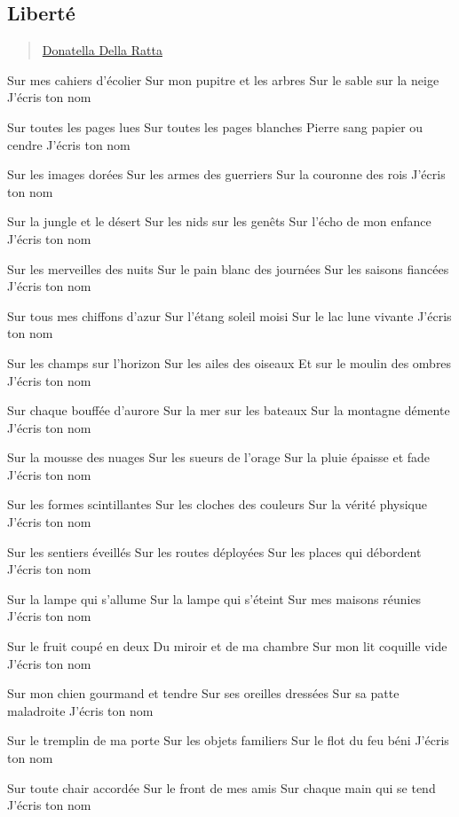 \subsection{Liberté}\label{libertuxe9}

\begin{quote}
\href{../appendix/attributions.html\#donatella-della-ratta}{Donatella
Della Ratta}
\end{quote}

Sur mes cahiers d'écolier Sur mon pupitre et les arbres Sur le sable sur
la neige J'écris ton nom

Sur toutes les pages lues Sur toutes les pages blanches Pierre sang
papier ou cendre J'écris ton nom

Sur les images dorées Sur les armes des guerriers Sur la couronne des
rois J'écris ton nom

Sur la jungle et le désert Sur les nids sur les genêts Sur l'écho de mon
enfance J'écris ton nom

Sur les merveilles des nuits Sur le pain blanc des journées Sur les
saisons fiancées J'écris ton nom

Sur tous mes chiffons d'azur Sur l'étang soleil moisi Sur le lac lune
vivante J'écris ton nom

Sur les champs sur l'horizon Sur les ailes des oiseaux Et sur le moulin
des ombres J'écris ton nom

Sur chaque bouffée d'aurore Sur la mer sur les bateaux Sur la montagne
démente J'écris ton nom

Sur la mousse des nuages Sur les sueurs de l'orage Sur la pluie épaisse
et fade J'écris ton nom

Sur les formes scintillantes Sur les cloches des couleurs Sur la vérité
physique J'écris ton nom

Sur les sentiers éveillés Sur les routes déployées Sur les places qui
débordent J'écris ton nom

Sur la lampe qui s'allume Sur la lampe qui s'éteint Sur mes maisons
réunies J'écris ton nom

Sur le fruit coupé en deux Du miroir et de ma chambre Sur mon lit
coquille vide J'écris ton nom

Sur mon chien gourmand et tendre Sur ses oreilles dressées Sur sa patte
maladroite J'écris ton nom

Sur le tremplin de ma porte Sur les objets familiers Sur le flot du feu
béni J'écris ton nom

Sur toute chair accordée Sur le front de mes amis Sur chaque main qui se
tend J'écris ton nom

